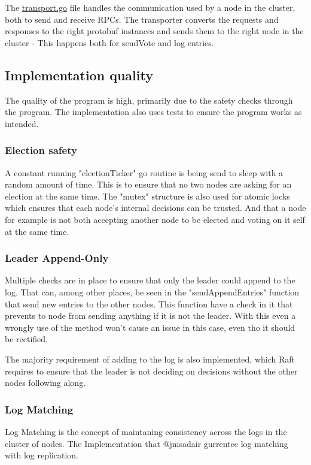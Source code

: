 \documentclass[a4paper,11pt]{article}
\begin{document}
The \href{https://github.com/jmsadair/raft/blob/dev/transport.go}{transport.go} file handles the communication used by a node in the cluster, both to send and receive RPCs. 
The transporter converts the requests and responses to the right protobuf instances and sends them to the right node in the cluster - This happens both for sendVote and log entries. 

\subsection*{Implementation quality}
The quality of the program is high, primarily due to the safety checks through the program. The implementation also uses tests to ensure the program works as intended.

\subsubsection*{Election safety}
A constant running "electionTicker" go routine is being send to sleep with a random amount of time.
This is to ensure that no two nodes are asking for an election at the same time.
The "mutex" structure is also used for atomic locks which ensures that each node's internal decisions can be trusted.
And that a node for example is not both accepting another node to be elected and voting on it self at the same time.

\subsubsection*{Leader Append-Only}
Multiple checks are in place to ensure that only the leader could append to the log.
That can, among other places, be seen in the "sendAppendEntries" function that send new entries to the other nodes.
This function have a check in it that prevents to node from sending anything if it is not the leader.
With this even a wrongly use of the method won't cause an issue in this case, even tho it should be rectified.

The majority requirement of adding to the log is also implemented, 
which Raft requires to ensure that the leader is not deciding on decisions without the other nodes following along.

\subsubsection*{Log Matching}
Log Matching is the concept of maintaning consistency across the logs in the cluster of nodes. The Implementation that @jmsadair gurrentee log matching with log replication.
\end{document}
